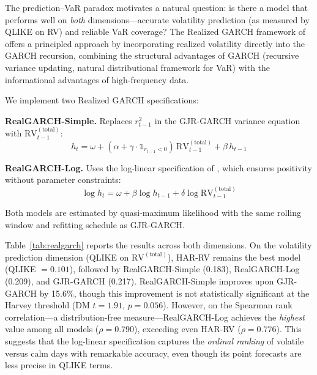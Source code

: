 The prediction--VaR paradox motivates a natural question: is there a model that performs well on \textit{both} dimensions---accurate volatility prediction (as measured by QLIKE on RV) and reliable VaR coverage? The Realized GARCH framework of \citet{hansen2012} offers a principled approach by incorporating realized volatility directly into the GARCH recursion, combining the structural advantages of GARCH (recursive variance updating, natural distributional framework for VaR) with the informational advantages of high-frequency data.

We implement two Realized GARCH specifications:

\textbf{RealGARCH-Simple.} Replaces $r_{t-1}^2$ in the GJR-GARCH variance equation with $\text{RV}_{t-1}^{(\text{total})}$:
\begin{equation}
h_t = \omega + (\alpha + \gamma \cdot \mathbb{1}_{r_{t-1}<0}) \, \text{RV}_{t-1}^{(\text{total})} + \beta \, h_{t-1}
\label{eq:realgarch_simple}
\end{equation}

\textbf{RealGARCH-Log.} Uses the log-linear specification of \citet{hansen2012}, which ensures positivity without parameter constraints:
\begin{equation}
\log h_t = \omega + \beta \log h_{t-1} + \delta \log \text{RV}_{t-1}^{(\text{total})}
\label{eq:realgarch_log}
\end{equation}

Both models are estimated by quasi-maximum likelihood with the same rolling window and refitting schedule as GJR-GARCH.

Table~\ref{tab:realgarch} reports the results across both dimensions. On the volatility prediction dimension (QLIKE on $\text{RV}^{(\text{total})}$), HAR-RV remains the best model (QLIKE $= 0.101$), followed by RealGARCH-Simple (0.183), RealGARCH-Log (0.209), and GJR-GARCH (0.217). RealGARCH-Simple improves upon GJR-GARCH by 15.6\%, though this improvement is not statistically significant at the Harvey threshold (DM $t = 1.91$, $p = 0.056$). However, on the Spearman rank correlation---a distribution-free measure---RealGARCH-Log achieves the \textit{highest} value among all models ($\rho = 0.790$), exceeding even HAR-RV ($\rho = 0.776$). This suggests that the log-linear specification captures the \textit{ordinal ranking} of volatile versus calm days with remarkable accuracy, even though its point forecasts are less precise in QLIKE terms.


